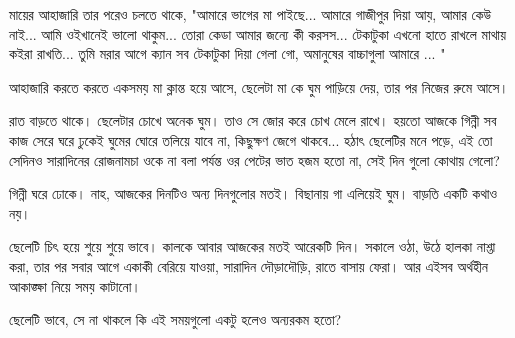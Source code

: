 মায়ের আহাজারি তার পরেও চলতে থাকে, "আমারে ভাগের মা পাইছে... আমারে গাজীপুর দিয়া আয়, আমার কেউ নাই... আমি ওইখানেই ভালো থাকুম... তোরা কেডা আমার জন্যে কী করসস... টেকাটুকা এখনো হাতে রাখলে মাথায় কইরা রাখতি... তুমি মরার আগে ক্যান সব টেকাটুকা দিয়া গেলা গো, অমানুষের বাচ্চাগুলা আমারে ... "

আহাজারি করতে করতে একসময় মা ক্লান্ত হয়ে আসে, ছেলেটা মা কে ঘুম পাড়িয়ে দেয়, তার পর নিজের রুমে আসে।

রাত বাড়তে থাকে। ছেলেটার চোখে অনেক ঘুম। তাও সে জোর করে চোখ মেলে রাখে। হয়তো আজকে গিন্নী সব কাজ সেরে ঘরে ঢুকেই ঘুমের ঘোরে তলিয়ে যাবে না, কিছুক্ষণ জেগে থাকবে... হঠাৎ ছেলেটির মনে পড়ে, এই তো সেদিনও সারাদিনের রোজনামচা ওকে না বলা পর্যন্ত ওর পেটের ভাত হজম হতো না, সেই দিন গুলো কোথায় গেলো?

গিন্নী ঘরে ঢোকে। নাহ, আজকের দিনটিও অন্য দিনগুলোর মতই। বিছানায় গা এলিয়েই ঘুম। বাড়তি একটি কথাও নয়।

ছেলেটি চিৎ হয়ে শুয়ে শুয়ে ভাবে। কালকে আবার আজকের মতই আরেকটি দিন। সকালে ওঠা, উঠে হালকা নাশ্তা করা, তার পর সবার আগে একাকী বেরিয়ে যাওয়া, সারাদিন দৌড়াদৌড়ি, রাতে বাসায় ফেরা। আর এইসব অর্থহীন আকাঙ্ক্ষা নিয়ে সময় কাটানো।

ছেলেটি ভাবে, সে না থাকলে কি এই সময়গুলো একটু হলেও অন্যরকম হতো?

